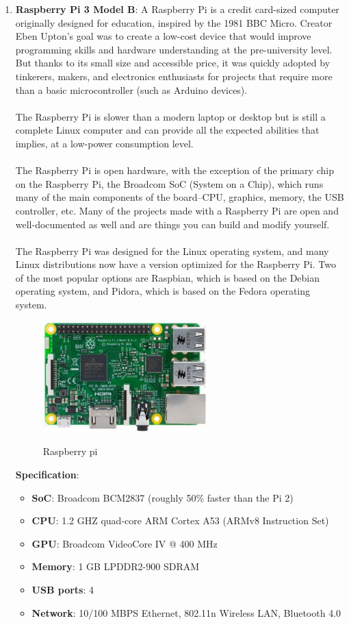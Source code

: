 \begin{enumerate}
\item \textbf{Raspberry Pi 3 Model B}: 
A Raspberry Pi is a credit card-sized computer originally designed for education, inspired by the 1981 BBC Micro. Creator Eben Upton's goal was to create a low-cost device that would improve programming skills and hardware understanding at the pre-university level. But thanks to its small size and accessible price, it was quickly adopted by tinkerers, makers, and electronics enthusiasts for projects that require more than a basic microcontroller (such as Arduino devices).
\\
\\
The Raspberry Pi is slower than a modern laptop or desktop but is still a complete Linux computer and can provide all the expected abilities that implies, at a low-power consumption level.
\\
\\
The Raspberry Pi is open hardware, with the exception of the primary chip on the Raspberry Pi, the Broadcom SoC (System on a Chip), which runs many of the main components of the board–CPU, graphics, memory, the USB controller, etc. Many of the projects made with a Raspberry Pi are open and well-documented as well and are things you can build and modify yourself.
\\
\\
The Raspberry Pi was designed for the Linux operating system, and many Linux distributions now have a version optimized for the Raspberry Pi. Two of the most popular options are Raspbian, which is based on the Debian operating system, and Pidora, which is based on the Fedora operating system.
\begin{figure}
\centering
\includegraphics[width=0.6\textwidth]{./pi}\\[0.1in]
\label{fig:Raspberry pi}
\caption{Raspberry pi}
\end{figure}


\textbf{Specification}:
\begin{itemize}
	\item \textbf{SoC}: Broadcom BCM2837 (roughly 50\% faster than the Pi 2)
	\item \textbf{CPU}: 1.2 GHZ quad-core ARM Cortex A53 (ARMv8 Instruction Set)
	\item \textbf{GPU}: Broadcom VideoCore IV @ 400 MHz
	\item \textbf{Memory}: 1 GB LPDDR2-900 SDRAM
	\item \textbf{USB ports}: 4
	\item \textbf{Network}: 10/100 MBPS Ethernet, 802.11n Wireless LAN, Bluetooth 4.0
\end{itemize}


\end{enumerate}
